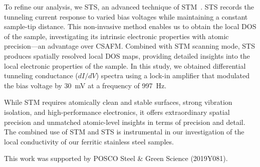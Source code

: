 \documentclass[jkps,reprint,twocolumn,showkeys]{revtex4}
\begin{document}
To refine our analysis, we STS, an advanced technique of STM~\cite{bert2015scanning, feenstra1994ScanningTunnelingSpectroscopy}. 
STS records the tunneling current response to varied bias voltages while maintaining a constant sample-tip distance. 
This non-invasive method enables us to obtain the local DOS of the sample, investigating its intrinsic electronic properties with atomic precision---an advantage over CSAFM. 
Combined with STM scanning mode, STS produces spatially resolved local DOS maps, providing detailed insights into the local electronic properties of the sample.
In this study, we obtained differential tunneling conductance ($dI/dV$) spectra using a lock-in amplifier that modulated the bias voltage by 30~mV at a frequency of 997~Hz.

While STM requires atomically clean and stable surfaces, strong vibration isolation, and high-performance electronics, it offers extraordinary spatial precision and unmatched atomic-level insights in terms of precision and detail. 
The combined use of STM and STS is instrumental in our investigation of the local conductivity of our ferritic stainless steel samples.

\begin{acknowledgments}
This work was supported by POSCO Steel \& Green Science (2019Y081).
\end{acknowledgments}
\end{document}
